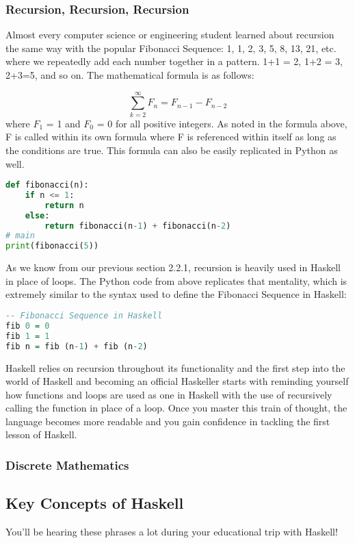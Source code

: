 \documentclass{article}
\begin{document}
\subsubsection{Recursion, Recursion, Recursion}
Almost every computer science or engineering student learned about recursion the same way with the popular Fibonacci Sequence: 1, 1, 2, 3, 5, 8, 13, 21, etc. where we repeatedly add each number together in a pattern. 1+1 = 2, 1+2 = 3, 2+3=5, and so on. The mathematical formula is as follows:

\[ \sum_{k=2}^{\infty}F_{n}  = F_{n-1} - F_{n-2} \]
\noindent
where $F_{1}$ = 1 and $F_{0}$ = 0 for all positive integers. As noted in the formula above, F is called within its own formula where F is referenced within itself as long as the conditions are true. This formula can also be easily replicated in Python as well.

\begin{lstlisting}[language=Python]
def fibonacci(n):
    if n <= 1:
        return n
    else:
        return fibonacci(n-1) + fibonacci(n-2)
# main
print(fibonacci(5))
\end{lstlisting}
\noindent
As we know from our previous section 2.2.1, recursion is heavily used in Haskell in place of loops. The Python code from above replicates that mentality, which is extremely similar to the syntax used to define the Fibonacci Sequence in Haskell:

\begin{lstlisting}[language=haskell]
-- Fibonacci Sequence in Haskell
fib 0 = 0
fib 1 = 1
fib n = fib (n-1) + fib (n-2)
\end{lstlisting}
\noindent
Haskell relies on recursion throughout its functionality and the first step into the world of Haskell and becoming an official Haskeller starts with reminding yourself how functions and loops are used as one in Haskell with the use of recursively calling the function in place of a loop. Once you master this train of thought, the language becomes more readable and you gain confidence in tackling the first lesson of Haskell.

\subsubsection{Discrete Mathematics}

\subsection{Key Concepts of Haskell}
You'll be hearing these phrases a lot during your educational trip with Haskell!
\end{document}
